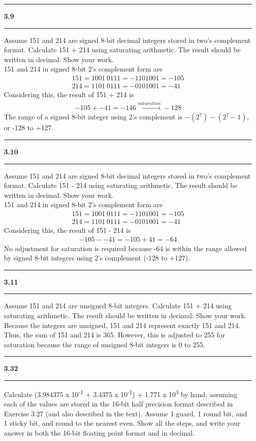 \documentclass[11pt]{article}
\newcommand\question[2]{\vspace{.25in}\hrule\textbf{#1 #2}\vspace{.5em}\hrule\vspace{.10in}}
\begin{document}
\question{3.9}{} 
Assume 151 and 214 are signed 8-bit decimal integers stored in two’s complement format. Calculate 151 + 214 using saturating arithmetic. The result should be written in decimal. Show your work.\\[1em]

151 and 214 in signed 8-bit 2's complement form are
\begin{gather*}
151 = 1001 \: 0111 = -1101001 = -105 \\
214 = 1101 \: 0111 = -0101001 = -41 
\end{gather*}
Considering this, the result of 151 + 214 is 
\begin{gather*}
-105 + -41 = -146 \xrightarrow{saturation} -128
\end{gather*}
The range of a signed 8-bit integer using 2's complement is $-(2^7) - (2^7 - 1)$, or -128 to +127.

\question{3.10}{} 
Assume 151 and 214 are signed 8-bit decimal integers stored in two’s complement format. Calculate 151 - 214 using saturating arithmetic. The result should be written in decimal. Show your work.\\[1em]

151 and 214 in signed 8-bit 2's complement form are
\begin{gather*}
151 = 1001 \: 0111 = -1101001 = -105 \\
214 = 1101 \: 0111 = -0101001 = -41 
\end{gather*}
Considering this, the result of 151 - 214 is 
\begin{gather*}
-105 - -41 = -105 + 41 = -64
\end{gather*}
No adjustment for saturation is required because -64 is within the range allowed by signed 8-bit integers using 2's complement (-128 to +127).

\question{3.11}{} 
Assume 151 and 214 are unsigned 8-bit integers. Calculate 151 + 214 using saturating arithmetic. The result should be written in decimal. Show your work.\\[1em]

Because the integers are unsigned, 151 and 214 represent exactly 151 and 214. Thus, the sum of 151 and 214 is 365. However, this is adjusted to 255 for saturation because the range of unsigned 8-bit integers is 0 to 255.

\question{3.32}{} 
 Calculate (3.984375 x 10\textsuperscript{-1} + 3.4375 x 10\textsuperscript{-1}) + 1.771 x 10\textsuperscript{3} by hand, assuming each of the values are stored in the 16-bit half precision format described in Exercise 3.27 (and also described in the text). Assume 1 guard, 1 round bit, and 1 sticky bit, and round to the nearest even. Show all the steps, and write your answer in both the 16-bit floating point format and in decimal.\\[1em]
\end{document}
